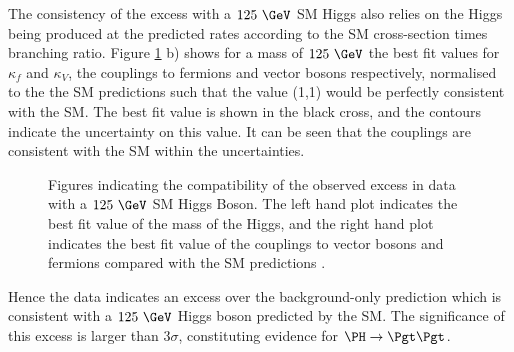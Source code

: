 The consistency of the excess with a $125~\GeV$ \ac{SM} Higgs also relies on the
Higgs being produced at the predicted rates according to the \ac{SM}
cross-section times branching ratio. Figure \ref{fig:results-properties} b) shows
for a mass of $125~\GeV$ the  best fit values for $\kappa_{f}$ and $\kappa_{V}$,
the couplings to fermions and vector bosons respectively, normalised to the the
\ac{SM} predictions such that the value (1,1) would be perfectly consistent with
the \ac{SM}. The best fit value is shown in the black cross, and the contours
indicate the uncertainty on this value. It can be seen that the couplings are
consistent with the \ac{SM} within the uncertainties.

\begin{figure}[h!]
\caption{Figures indicating the compatibility of the observed excess in data
with a $125~\GeV$ \ac{SM} Higgs Boson. The left hand plot indicates the best fit
value of the mass of the Higgs, and the right hand plot indicates the best fit
value of the couplings to vector bosons and fermions compared with the \ac{SM}
predictions \cite{HIG-13-004}.}
\label{fig:results-properties}
\end{figure}

Hence the data indicates an excess over the background-only prediction which is
consistent with a $125~\GeV$ Higgs boson predicted by the \ac{SM}. The
significance of this excess is larger than $3\sigma$, constituting evidence for
$\HToTauTau$.



